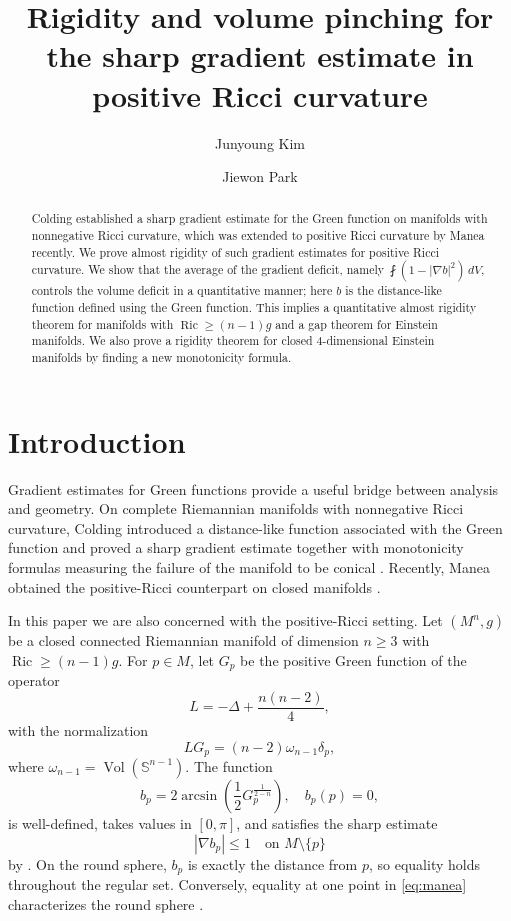 \documentclass[11pt]{amsart}
\title[Rigidity and volume pinching]{Rigidity and volume pinching for the sharp gradient estimate in positive Ricci curvature}
\author[Kim]{Junyoung Kim}
\author[Park]{Jiewon Park}
\theoremstyle{plain}
\numberwithin{equation}{section}
\renewcommand{\S}{\mathbb{S}}
\DeclareMathOperator{\ric}{Ric}
\DeclareMathOperator{\vol}{Vol}
\begin{document}
\begin{abstract}
Colding established a sharp gradient estimate for the Green function on manifolds with nonnegative Ricci curvature, which was extended to positive Ricci curvature by Manea recently. We prove almost rigidity of such gradient estimates for positive Ricci curvature. We show that the average of the gradient deficit, namely $\fint (1-|\nabla b|^2)\,dV$, controls the volume deficit in a quantitative manner; here $b$ is the distance-like function defined using the Green function. This implies a quantitative almost rigidity theorem for manifolds with $\ric\ge(n-1)g$ and a gap theorem for Einstein manifolds. We also prove a rigidity theorem for closed 4-dimensional Einstein manifolds by finding a new monotonicity formula.
\end{abstract}

\maketitle

\section{Introduction}

Gradient estimates for Green functions provide a useful bridge between analysis and geometry. On complete Riemannian manifolds with nonnegative Ricci curvature, Colding introduced a distance-like function associated with the Green function and proved a sharp gradient estimate together with monotonicity formulas measuring the failure of the manifold to be conical \cite{Col12}. Recently, Manea obtained the positive-Ricci counterpart on closed manifolds \cite{Man25}.

In this paper we are also concerned with the positive-Ricci setting. Let $(M^n,g)$ be a closed connected Riemannian manifold of dimension $n\ge 3$ with $\ric\ge(n-1)g$. For $p\in M$, let $G_p$ be the positive Green function of the operator
\begin{equation*}
L=-\Delta+\frac{n(n-2)}{4},
\end{equation*}
with the normalization
\begin{equation}\label{eq:green-function-normalization}
LG_p=(n-2)\omega_{n-1}\delta_p,
\end{equation}
where $\omega_{n-1}=\vol(\S^{n-1})$. The function
\begin{equation}\label{eq:function b}
b_p=2\arcsin\left(\frac{1}{2}G_p^{\frac{1}{2-n}}\right),\quad b_p(p)=0,
\end{equation}
is well-defined, takes values in $[0,\pi]$, and satisfies the sharp estimate
\begin{equation}\label{eq:manea}
    |\nabla b_p|\le 1\quad\text{on $M\setminus\{p\}$}
\end{equation}
by \cite{Man25}. On the round sphere, $b_p$ is exactly the distance from $p$, so equality holds throughout the regular set. Conversely, equality at one point in \eqref{eq:manea} characterizes the round sphere \cite{Man25}.
\end{document}
